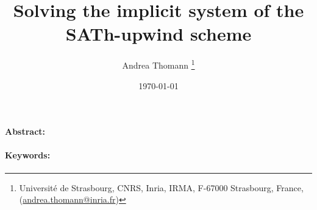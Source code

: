 \documentclass[3p]{scrartcl}%
\newcommand*\samethanks[1][\value{footnote}]{\footnotemark[#1]}
\begin{document}
    \title{
        \textbf{Solving the implicit system of the SATh-upwind scheme}
    }

    \author{
        Andrea Thomann\thanksgap{-0.5ex}
        \thanks{Universit\'e de Strasbourg, CNRS, Inria, IRMA, F-67000 Strasbourg, France,
            (\href{mailto:andrea.thomann@inria.fr}{andrea.thomann@inria.fr})}
    }

    \maketitle %

    \date{\today}

    \paragraph{Abstract:}
    \paragraph{Keywords:}


\end{document}
